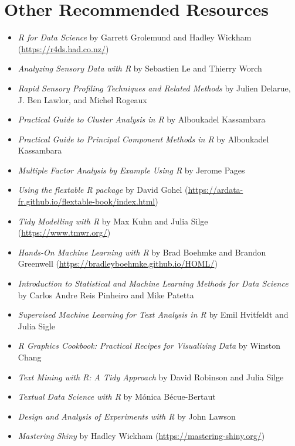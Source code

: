 \documentclass[
]{krantz}
\providecommand{\tightlist}{%
  \setlength{\itemsep}{0pt}\setlength{\parskip}{0pt}}
\begin{document}
\hypertarget{other-recommended-resources}{%
\section{Other Recommended Resources}\label{other-recommended-resources}}

\begin{itemize}
\tightlist
\item
  \emph{R for Data Science} by Garrett Grolemund and Hadley Wickham (\url{https://r4ds.had.co.nz/})
\item
  \emph{Analyzing Sensory Data with R} by Sebastien Le and Thierry Worch
\item
  \emph{Rapid Sensory Profiling Techniques and Related Methods} by Julien Delarue, J. Ben Lawlor, and Michel Rogeaux
\item
  \emph{Practical Guide to Cluster Analysis in R} by Alboukadel Kassambara
\item
  \emph{Practical Guide to Principal Component Methods in R} by Alboukadel Kassambara
\item
  \emph{Multiple Factor Analysis by Example Using R} by Jerome Pages
\item
  \emph{Using the flextable R package} by David Gohel (\url{https://ardata-fr.github.io/flextable-book/index.html})
\item
  \emph{Tidy Modelling with R} by Max Kuhn and Julia Silge (\url{https://www.tmwr.org/})
\item
  \emph{Hands-On Machine Learning with R} by Brad Boehmke and Brandon Greenwell (\url{https://bradleyboehmke.github.io/HOML/})
\item
  \emph{Introduction to Statistical and Machine Learning Methods for Data Science} by Carlos Andre Reis Pinheiro and Mike Patetta
\item
  \emph{Supervised Machine Learning for Text Analysis in R} by Emil Hvitfeldt and Julia Sigle
\item
  \emph{R Graphics Cookbook: Practical Recipes for Visualizing Data} by Winston Chang
\item
  \emph{Text Mining with R: A Tidy Approach} by David Robinson and Julia Silge
\item
  \emph{Textual Data Science with R} by Mónica Bécue-Bertaut
\item
  \emph{Design and Analysis of Experiments with R} by John Lawson
\item
  \emph{Mastering Shiny} by Hadley Wickham (\url{https://mastering-shiny.org/})
\end{itemize}
\end{document}
